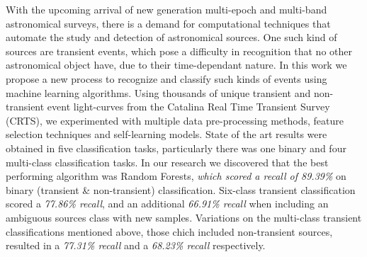 

With the upcoming arrival of new generation multi-epoch and multi-band astronomical surveys, there is a demand for computational techniques that automate the study and detection of astronomical sources. One such kind of sources are transient events, which pose a difficulty in recognition that no other astronomical object have, due to their time-dependant nature. In this work we propose a new process to recognize and classify such kinds of events using machine learning algorithms. Using thousands of unique transient and non-transient event light-curves from the Catalina Real Time Transient Survey (CRTS), we experimented  with multiple data pre-processing methods, feature selection techniques and self-learning models. State of the art results were obtained in five classification tasks, particularly there was one binary and four multi-class classification tasks. In our research we discovered that the best performing algorithm was Random Forests, \textit{which scored a recall of 89.39\%} on binary (transient \& non-transient) classification. Six-class transient classification scored a \textit{77.86\% recall}, and an additional \textit{66.91\% recall} when including an ambiguous sources class with new samples. Variations on the multi-class transient classifications mentioned above, those chich included non-transient sources, resulted in a \textit{77.31\% recall} and a \textit{68.23\% recall} respectively. 